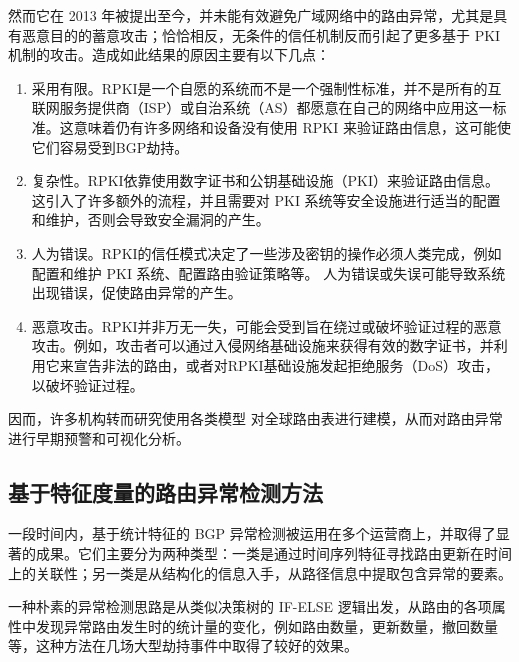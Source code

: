 然而它在 2013 年被提出至今，并未能有效避免广域网络中的路由异常，尤其是具有恶意目的的蓄意攻击；恰恰相反，无条件的信任机制反而引起了更多基于 PKI 机制的攻击。造成如此结果的原因主要有以下几点：

\begin{enumerate}
    \item 采用有限。RPKI是一个自愿的系统而不是一个强制性标准，并不是所有的互联网服务提供商（ISP）或自治系统（AS）都愿意在自己的网络中应用这一标准。这意味着仍有许多网络和设备没有使用 RPKI 来验证路由信息，这可能使它们容易受到BGP劫持。
    \item 复杂性。RPKI依靠使用数字证书和公钥基础设施（PKI）来验证路由信息。这引入了许多额外的流程，并且需要对 PKI 系统等安全设施进行适当的配置和维护，否则会导致安全漏洞的产生。
    \item 人为错误。RPKI的信任模式决定了一些涉及密钥的操作必须人类完成，例如配置和维护 PKI 系统、配置路由验证策略等。 人为错误或失误可能导致系统出现错误，促使路由异常的产生。
    \item 恶意攻击。RPKI并非万无一失，可能会受到旨在绕过或破坏验证过程的恶意攻击。例如，攻击者可以通过入侵网络基础设施来获得有效的数字证书，并利用它来宣告非法的路由，或者对RPKI基础设施发起拒绝服务（DoS）攻击，以破坏验证过程。
\end{enumerate}

因而，许多机构转而研究使用各类模型 对全球路由表进行建模，从而对路由异常进行早期预警和可视化分析。

\subsection{基于特征度量的路由异常检测方法}


一段时间内，基于统计特征的 BGP 异常检测被运用在多个运营商上，并取得了显著的成果。它们主要分为两种类型：一类是通过时间序列特征寻找路由更新在时间上的关联性；另一类是从结构化的信息入手，从路径信息中提取包含异常的要素。 

一种朴素的异常检测思路是从类似决策树的 IF-ELSE 逻辑出发，从路由的各项属性中发现异常路由发生时的统计量的变化，例如路由数量，更新数量，撤回数量等，这种方法在几场大型劫持事件中取得了较好的效果。 %

